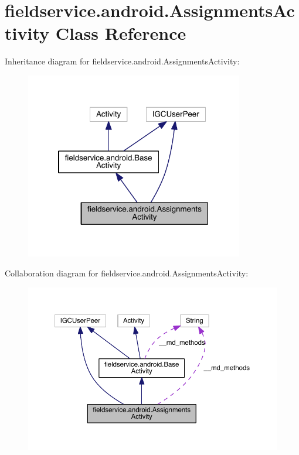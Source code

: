 \hypertarget{classfieldservice_1_1android_1_1_assignments_activity}{\section{fieldservice.\+android.\+Assignments\+Activity Class Reference}
\label{classfieldservice_1_1android_1_1_assignments_activity}
}


Inheritance diagram for fieldservice.\+android.\+Assignments\+Activity\+:
\nopagebreak
\begin{figure}[H]
\begin{center}
\leavevmode
\includegraphics[width=270pt]{classfieldservice_1_1android_1_1_assignments_activity__inherit__graph}
\end{center}
\end{figure}


Collaboration diagram for fieldservice.\+android.\+Assignments\+Activity\+:
\nopagebreak
\begin{figure}[H]
\begin{center}
\leavevmode
\includegraphics[width=350pt]{classfieldservice_1_1android_1_1_assignments_activity__coll__graph}
\end{center}
\end{figure}
